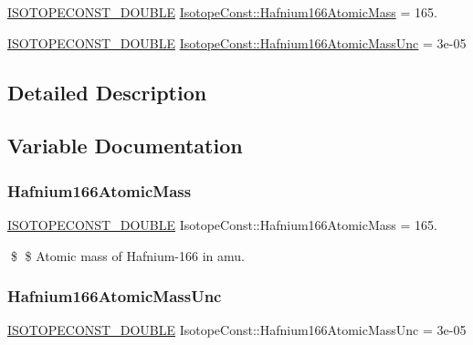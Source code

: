 \begin{DoxyCompactItemize}
\item 
\mbox{\hyperlink{group___isotope_const-_macros_ga8f45a7272ce02c0b4c65c44636ed719a}{I\+S\+O\+T\+O\+P\+E\+C\+O\+N\+S\+T\+\_\+\+D\+O\+U\+B\+LE}} \mbox{\hyperlink{group___isotope_const-_hafnium-_hf166_ga4d725a084c06c0c6f1739be9df937f18}{Isotope\+Const\+::\+Hafnium166\+Atomic\+Mass}} = 165.
\item 
\mbox{\hyperlink{group___isotope_const-_macros_ga8f45a7272ce02c0b4c65c44636ed719a}{I\+S\+O\+T\+O\+P\+E\+C\+O\+N\+S\+T\+\_\+\+D\+O\+U\+B\+LE}} \mbox{\hyperlink{group___isotope_const-_hafnium-_hf166_ga53fb237a59ddf3aa73d14ec38fa0c62f}{Isotope\+Const\+::\+Hafnium166\+Atomic\+Mass\+Unc}} = 3e-\/05
\end{DoxyCompactItemize}


\subsection{Detailed Description}


\subsection{Variable Documentation}
\mbox{\label{group___isotope_const-_hafnium-_hf166_ga4d725a084c06c0c6f1739be9df937f18}} 
\subsubsection{\texorpdfstring{Hafnium166\+Atomic\+Mass}{Hafnium166AtomicMass}}
{\footnotesize\ttfamily \mbox{\hyperlink{group___isotope_const-_macros_ga8f45a7272ce02c0b4c65c44636ed719a}{I\+S\+O\+T\+O\+P\+E\+C\+O\+N\+S\+T\+\_\+\+D\+O\+U\+B\+LE}} Isotope\+Const\+::\+Hafnium166\+Atomic\+Mass = 165.}

\$ \$ Atomic mass of Hafnium-\/166 in amu. \mbox{\label{group___isotope_const-_hafnium-_hf166_ga53fb237a59ddf3aa73d14ec38fa0c62f}} 
\subsubsection{\texorpdfstring{Hafnium166\+Atomic\+Mass\+Unc}{Hafnium166AtomicMassUnc}}
{\footnotesize\ttfamily \mbox{\hyperlink{group___isotope_const-_macros_ga8f45a7272ce02c0b4c65c44636ed719a}{I\+S\+O\+T\+O\+P\+E\+C\+O\+N\+S\+T\+\_\+\+D\+O\+U\+B\+LE}} Isotope\+Const\+::\+Hafnium166\+Atomic\+Mass\+Unc = 3e-\/05}

